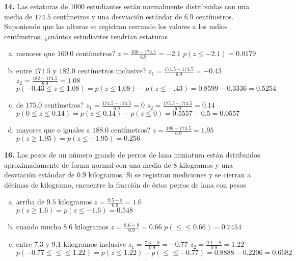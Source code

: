 \documentclass[12pt, letterpaper]{article}
\begin{document}
    \textbf{14. }Las estaturas de 1000 estudiantes están normalmente distribuidas con una media de $174.5$ centímetros y
    una desviación estándar de $6.9$ centímetros. Suponiendo  que las alturas se registran cerrando los valores a los mdios
    centímetros, ¿cuántos estudiantes tendrían estaturas
    \begin{enumerate}[a)]
        \item menores que $160.0$ centímetros?\vskip0.5cm
        $z=\displaystyle\frac{160-174.5}{6.9}=-2.1$\vskip0.5cm
        $p(z\leq -2.1)=0.0179$
        \item entre $171.5$ y $182.0$ centímetros inclusive?\vskip0.5cm
        $z_1=\displaystyle\frac{171.5-174.5}{6.9}=-0.43$\vskip0.5cm
        $z_2=\displaystyle\frac{182-174.5}{6.9}=1.08$\vskip0.5cm
        $p(-0.43\leq z\leq 1.08)=p(z\leq 1.08)-p(z\leq -.43)=0.8599-0.3336=0.5254$
        \item de $175.0$ centímetros?\vskip0.5cm
        $z_1=\displaystyle\frac{174.5-174.5}{6.9}=0$\vskip0.5cm
        $z_2=\displaystyle\frac{175.5-174.5}{6.9}=0.14$\vskip0.5cm
        $p(0\leq z\leq 0.14)=p(z\leq 0.14)-p(z\leq 0)=0.5557-0.5=0.0557$
        \item mayores que o iguales a $188.0$ centímetros?\vskip0.5cm
        $z=\displaystyle\frac{188-174.5}{6.9}=1.95$\vskip0.5cm
        $p(z\geq 1.95)=p(z\leq -1.95)=0.256$
    \end{enumerate}\vskip1cm

    \textbf{16. }Los pesos de un número grande de perros de lana miniatura están dstribuidos aproximadamente de forma normal
    con una media de $8$ kilogramos y  una desviación estándar de $0.9$ kilogramos. Si se registran mediciones y se cierran
    a décimas de kilogramo, encuentre la fracción de éstos perros de lana con pesos
    \begin{enumerate}[a)]
        \item arriba de $9.5$ kilogramos\vskip0.5cm
        $z=\displaystyle\frac{9.5-8}{0.9}=1.6$\vskip0.5cm
        $p(z\geq 1.6)=p(z\leq -1.6)=0.548$
        \item cuando mucho $8.6$ kilogramos\vskip0.5cm
        $z=\displaystyle\frac{8.6-8}{0.9}=0.66$\vskip0.5cm
        $p(\leq \leq 0.66) = 0.7454$
        \item entre $7.3$ y $9.1$ kilogramos inclusive\vskip0.5cm
        $z_1=\displaystyle\frac{7.3-8}{0.9}=-0.77$\vskip0.5cm
        $z_2=\displaystyle\frac{9.1-8}{0.9}=1.22$\vskip0.5cm
        $p(-0.77\leq \leq \leq 1.22)=p(z\leq 1.22)-p(\leq \leq -0.77)=0.8888-0.2206=0.6682$
    \end{enumerate}\vskip1cm
\end{document}
